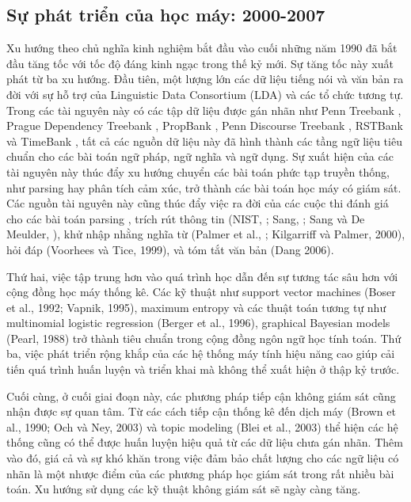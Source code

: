 \subsection{Sự phát triển của học máy: 2000-2007}

Xu hướng theo chủ nghĩa kinh nghiệm bắt đầu vào cuối những năm 1990 đã bắt đầu tăng tốc với tốc độ đáng kinh ngạc trong thế kỷ mới. Sự tăng tốc này xuất phát từ ba xu hướng. Đầu tiên, một lượng lớn các dữ liệu tiếng nói và văn bản ra đời với sự hỗ trợ của Linguistic Data Consortium (LDA) và các tổ chức tương tự. Trong các tài nguyên này có các tập dữ liệu được gán nhãn như Penn Treebank \citep{marcus1993building}, Prague Dependency Treebank \citep{hajic:1998}, PropBank \citep{palmer2005proposition}, Penn Discourse Treebank \citep{miltsakaki2004penn}, RSTBank \citep{carlson2001discourse} và TimeBank \citep{pustejovsky2003timebank}, tất cả các nguồn dữ liệu này đã hình thành các tầng ngữ liệu tiêu chuẩn cho các bài toán ngữ pháp, ngữ nghĩa và ngữ dụng. Sự xuất hiện của các tài nguyên này thúc đẩy xu hướng chuyển các bài toán phức tạp truyền thống, như parsing hay phân tích cảm xúc, trở thành các bài toán học máy có giám sát. Các nguồn tài nguyên này cũng thúc đẩy việc ra đời của các cuộc thi đánh giá cho các bài toán parsing \citep{sang2001introduction}, trích rút thông tin (NIST, \citeyear{nist2007}; Sang, \citeyear{TjongKimSang:2002:ICS:1118853.1118877}; Sang và De Meulder, \citeyear{tjong2003introduction}), khử nhập nhằng nghĩa từ (Palmer et al., \citeyear{Palmer:2001:ETA:2387364.2387369}; Kilgarriff và Palmer, 2000), hỏi đáp (Voorhees và Tice, 1999), và tóm tắt văn bản (Dang 2006).

Thứ hai, việc tập trung hơn vào quá trình học dẫn đến sự tương tác sâu hơn với cộng đồng học máy thống kê. Các kỹ thuật như support vector machines (Boser et al., 1992; Vapnik, 1995), maximum entropy và các thuật toán tương tự như multinomial logistic regression (Berger et al., 1996), graphical Bayesian models (Pearl, 1988) trở thành tiêu chuẩn trong cộng đồng ngôn ngữ học tính toán. Thứ ba, việc phát triển rộng khắp của các hệ thống máy tính hiệu năng cao giúp cải tiến quá trình huấn luyện và triển khai mà không thể xuất hiện ở thập kỷ trước.

Cuối cùng, ở cuối giai đoạn này, các phương pháp tiếp cận không giám sát cũng nhận được sự quan tâm. Từ các cách tiếp cận thống kê đến dịch máy (Brown et al., 1990; Och và Ney, 2003) và topic modeling (Blei et al., 2003) thể hiện các hệ thống cũng có thể được huấn luyện hiệu quả từ các dữ liệu chưa gán nhãn. Thêm vào đó, giá cả và sự khó khăn trong việc đảm bảo chất lượng cho các ngữ liệu có nhãn là một nhược điểm của các phương pháp học giám sát trong rất nhiều bài toán. Xu hướng sử dụng các kỹ thuật không giám sát sẽ ngày càng tăng.

